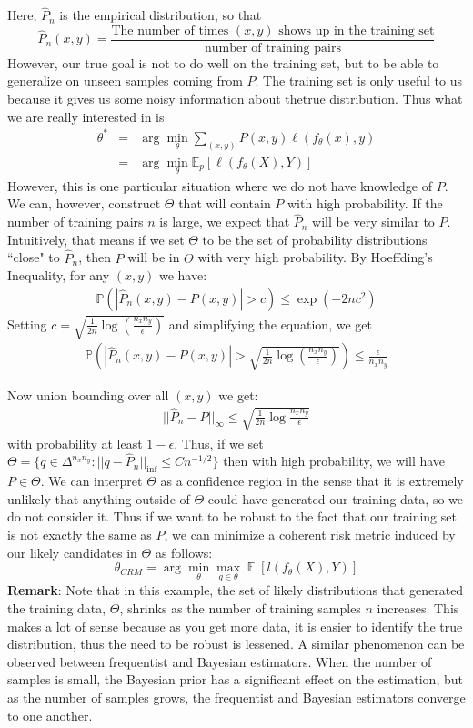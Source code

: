 \documentclass[twoside]{article}
\DeclareMathOperator{\EX}{\mathbb{E}}
\begin{document}
Here, $\hat{P}_n$ is the empirical distribution, so that
$$\hat{P}_n(x,y)= \frac{\textrm{The number of times }(x, y) \textrm{ shows up in the training set}}{\textrm{number of training pairs}}$$
However, our true goal is not to do well on the training set, but to be able to generalize on unseen samples coming from $P$. The training set is only useful to us because it gives us some noisy information about thetrue distribution. Thus what we are really interested in is
\begin{eqnarray*}
\theta^* &=& \arg\min_\theta \sum_{(x,y)} P(x,y) \ell(f_\theta (x) , y) \\
&=& \arg\min_\theta \mathbb{E}_p[\ell(f_\theta (X) , Y)]
\end{eqnarray*}
However, this is one particular situation where we do not have knowledge of $P$. We can, however, construct $\Theta$ that will contain $P$ with high probability. If the number of training pairs $n$ is large, we expect that $\hat{P}_n$ will be very similar to $P$. Intuitively, that means if we set $\Theta$ to be the set of probability distributions ``close" to $\hat{P}_n$, then $P$ will be in $\Theta$ with very high probability. By Hoeffding’s Inequality, for any $(x, y)$ we have:
\begin{eqnarray*}
\mathbb{P}\left(|\hat{P}_n(x,y) - P(x,y)| > c\right) \leq \exp\left(-2nc^2\right)
\end{eqnarray*}
Setting $c = \sqrt{\frac{1}{2n}\log(\frac{n_x n_y}{\epsilon})}$ and simplifying the equation, we get
\begin{eqnarray*}
\mathbb{P}\left(|\hat{P}_n(x,y) - P(x,y)| > \sqrt{\frac{1}{2n}\log(\frac{n_x n_y}{\epsilon})}\right) \leq \frac{\epsilon}{n_x n_y}
\end{eqnarray*}

Now union bounding over all $( x, y )$ we get:
\begin{eqnarray*}||\hat{P}_n - P||_\infty \leq \sqrt{\frac{1}{2n} \log \frac{n_x n_y}{\epsilon}}\end{eqnarray*}
with probability at least $1 − \epsilon$. Thus, if we set $\Theta = \{ q \in \Delta^{n_x n_y} : || q − \hat{P}_n|| _{\inf} \leq Cn^{−1/2} \}$ then with high probability, we will have $P \in \Theta$. We can interpret $\Theta$ as a confidence region in the sense that it is extremely unlikely that anything outside of $\Theta$ could have generated our training data, so we do not consider it. Thus if we want to be robust to the fact that our training set is not exactly the same as $P$, we can minimize a coherent risk metric induced by our likely candidates in $\Theta$ as follows:
$$\theta_{CRM}=\arg \min_{\theta}\max_{q\in\theta}\EX[l(f_\theta(X),Y)]$$
\textbf{Remark}: Note that in this example, the set of likely distributions that generated the training data, $ \Theta$, shrinks as the number of training samples $n$ increases. This makes a lot of sense because as you get more data, it is easier to identify the true distribution, thus the need to be robust is lessened. A similar phenomenon can be observed between frequentist and Bayesian estimators. When the number of samples is small, the Bayesian prior has a significant effect on the estimation, but as the number of samples grows, the frequentist and Bayesian estimators converge to one another.
\end{document}
